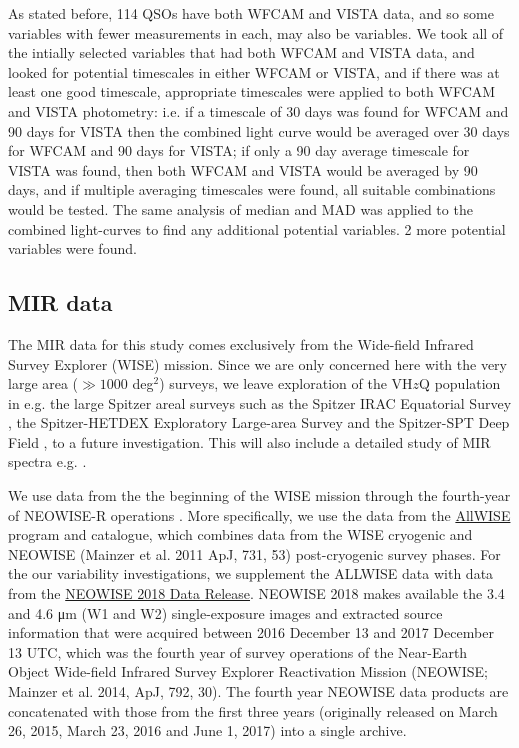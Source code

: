 \documentclass[usenatbib]{mnras}
\begin{document}
As stated before, 114 QSOs have both WFCAM and VISTA data, and so some
variables with fewer measurements in each, may also be variables. We
took all of the intially selected variables that had both WFCAM and
VISTA data, and looked for potential timescales in either WFCAM or
VISTA, and if there was at least one good timescale, appropriate
timescales were applied to both WFCAM and VISTA photometry: i.e. if a
timescale of 30 days was found for WFCAM and 90 days for VISTA then
the combined light curve would be averaged over 30 days for WFCAM and
90 days for VISTA; if only a 90 day average timescale for VISTA was
found, then both WFCAM and VISTA would be averaged by 90 days, and if
multiple averaging timescales were found, all suitable combinations
would be tested. The same analysis of median and MAD was applied to
the combined light-curves to find any additional potential
variables. 2 more potential variables were found.



\subsection{MIR data}
The MIR data for this study comes exclusively from the Wide-field
Infrared Survey Explorer (WISE) mission. Since we are only concerned
here with the very large area ($\gg1000$ deg$^2$) surveys, we leave
exploration of the VH$z$Q population in e.g. the large Spitzer areal
surveys such as the Spitzer IRAC Equatorial Survey \citep[SpIES;
][]{Timlin2016}, the Spitzer-HETDEX Exploratory Large-area Survey
\citep[SHELA; ][]{Papovich2016} and the Spitzer-SPT Deep Field
\citep[SSDF; ][]{Ashby2013}, to a future investigation. This will also
include a detailed study of MIR spectra e.g. \citet{Lambrides2018}.

We use data from the the beginning of the WISE mission \citep[2010
January; ][]{Wright2010} through the fourth-year of NEOWISE-R
operations \citep[2017 December;]{Mainzer2011}. More specifically, we
use the data from the
\href{http://wise2.ipac.caltech.edu/docs/release/allwise/}{AllWISE}
program and catalogue, which combines data from the WISE cryogenic and
NEOWISE (Mainzer et al. 2011 ApJ, 731, 53) post-cryogenic survey
phases. For the our variability investigations, we supplement the
ALLWISE data with data from the
\href{http://wise2.ipac.caltech.edu/docs/release/neowise/neowise_2018_release_intro.html}{NEOWISE
2018 Data Release}. NEOWISE 2018 makes available the 3.4 and 4.6 μm
(W1 and W2) single-exposure images and extracted source information
that were acquired between 2016 December 13 and 2017 December 13 UTC,
which was the fourth year of survey operations of the Near-Earth
Object Wide-field Infrared Survey Explorer Reactivation Mission
(NEOWISE; Mainzer et al. 2014, ApJ, 792, 30). The fourth year NEOWISE
data products are concatenated with those from the first three years
(originally released on March 26, 2015, March 23, 2016 and June 1,
2017) into a single archive.
\end{document}
